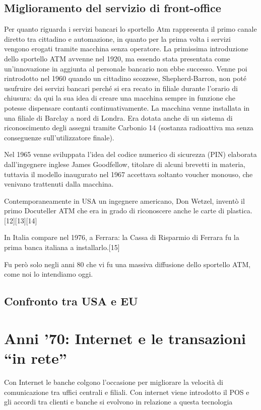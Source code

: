 \documentclass[aip, reprint]{article}
\begin{document}
\subsection{Miglioramento del servizio di front-office}
Per quanto riguarda i servizi bancari lo sportello Atm rappresenta il primo canale diretto tra cittadino e automazione, in quanto per la prima volta i servizi vengono erogati tramite macchina senza operatore.
La primissima introduzione dello sportello ATM avvenne nel 1920, ma essendo stata presentata come un’innovazione in aggiunta al personale bancario non ebbe successo. Venne poi rintrodotto nel 1960 quando un cittadino scozzese, Shepherd-Barron, non poté usufruire dei servizi bancari perché si era recato in filiale durante l’orario di chiusura: da qui la sua idea di creare una macchina sempre in funzione che potesse dispensare contanti continuativamente. La macchina venne installata in una filiale di Barclay a nord di Londra.
Era dotata anche di un sistema di riconoscimento degli assegni tramite Carbonio 14 (sostanza radioattiva ma senza conseguenze sull’utilizzatore finale).

Nel 1965 venne sviluppata l'idea del codice numerico di sicurezza (PIN) elaborata dall'ingegnere inglese James Goodfellow,  titolare di alcuni brevetti in materia, tuttavia il modello inaugurato nel 1967 accettava soltanto voucher monouso, che venivano trattenuti dalla macchina.

Contemporaneamente in USA un ingegnere americano, Don Wetzel, inventò il primo Docuteller ATM che era in grado di riconoscere anche le carte di plastica. [12][13][14]

In Italia compare nel 1976, a Ferrara: la Cassa di Risparmio di Ferrara fu la prima banca italiana a installarlo.[15]

Fu però solo negli anni 80 che vi fu una massiva diffusione dello sportello ATM, come noi lo intendiamo oggi.

\subsection{Confronto tra USA e EU}

\newpage
\section{Anni ’70: Internet e le transazioni “in rete”}
Con Internet le banche colgono l’occasione per migliorare la velocità di comunicazione tra uffici centrali e filiali. 
Con internet viene introdotto il POS e gli accordi tra clienti e banche si evolvono in relazione a questa tecnologia
\end{document}
